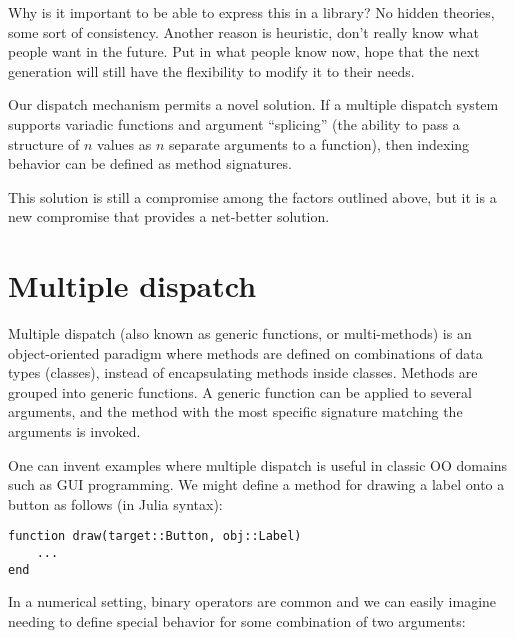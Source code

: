 \documentclass[preprint]{sigplanconf}
\begin{document}

Why is it important to be able to express this in a library? No hidden
theories, some sort of consistency. Another reason is heuristic, don't really
know what people want in the future. Put in what people know now, hope that
the next generation will still have the flexibility to modify it to their
needs.

Our dispatch mechanism permits a novel solution. If a multiple dispatch system
supports variadic functions and argument ``splicing'' (the ability to pass a
structure of $n$ values as $n$ separate arguments to a function), then
indexing behavior can be defined as method signatures.

This solution is still a compromise among the factors outlined above, but it
is a new compromise that provides a net-better solution.


\section{Multiple dispatch}

Multiple dispatch (also known as generic functions, or multi-methods) is an
object-oriented paradigm where methods are defined on combinations of data
types (classes), instead of encapsulating methods inside classes. Methods are
grouped into generic functions. A generic function can be applied to several
arguments, and the method with the most specific signature matching the
arguments is invoked.

One can invent examples where multiple dispatch is useful in classic OO domains
such as GUI programming. We might define a method for drawing a label onto
a button as follows (in Julia syntax):

\begin{verbatim}
function draw(target::Button, obj::Label)
    ...
end
\end{verbatim}

In a numerical setting, binary operators are common and we can easily imagine
needing to define special behavior for some combination of two arguments:
\end{document}

